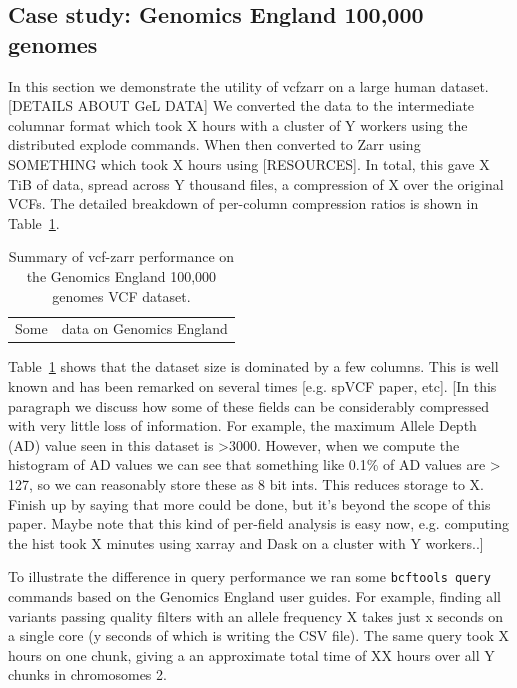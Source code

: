 \documentclass[a4paper,num-refs]{oup-contemporary}
\begin{document}
\subsection{Case study: Genomics England 100,000 genomes}
In this section we demonstrate the utility of vcfzarr on a large human dataset.
[DETAILS ABOUT GeL DATA]
We converted the data to the intermediate columnar format 
which took X hours with a cluster of Y workers using the 
distributed explode commands. When then converted to Zarr using 
SOMETHING which took X hours using [RESOURCES]. In total, this gave 
X TiB of data, spread across Y thousand files, a compression of 
X over the original VCFs.
The detailed breakdown of per-column compression ratios is 
shown in Table~\ref{tab-genomics-england-data}.

\begin{table}
\begin{tabular}{cc}
Some & data on Genomics England\\
\end{tabular}
\caption{Summary of vcf-zarr performance on the Genomics England 100,000
genomes VCF dataset.
\label{tab-genomics-england-data}}
\end{table}

Table~\ref{tab-genomics-england-data} shows that the dataset size is 
dominated by a few columns. This is well known and has been remarked 
on several times [e.g. spVCF paper, etc]. [In this paragraph we discuss
how some of these fields can be considerably compressed with very
little loss of information. For example, the maximum Allele Depth (AD)
value seen in this dataset is >3000. However, when we compute the 
histogram of AD values we can see that something like 0.1\% of 
AD values are > 127, so we can reasonably store these as 8 bit 
ints. This reduces storage to X. Finish up by saying that more 
could be done, but it's beyond the scope of this paper. Maybe note 
that this kind of per-field analysis is easy now, e.g. computing 
the hist took X minutes using xarray and Dask on a cluster with
Y workers..]

To illustrate the difference in query performance we ran some 
\texttt{bcftools query} commands based on the Genomics England 
user guides. For example, finding all variants passing 
quality filters with an allele frequency X takes just 
x seconds on a single core (y seconds of which is writing the 
CSV file). The same query took X hours on one chunk, giving a 
an approximate total time of XX hours over all Y chunks 
in chromosomes 2.
\end{document}
